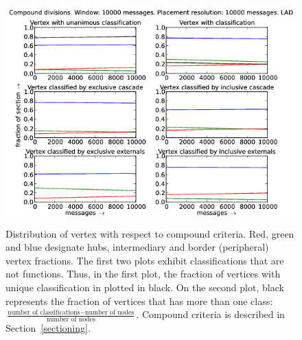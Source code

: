 \documentclass[%
 aip,
 jmp,%
 amsmath,amssymb,
 reprint,%
]{revtex4-1}
\begin{document}
\begin{figure}[hbtp] 
   \centering
        \includegraphics[width=\textwidth]{figs/LAD/10000_2}
    \caption{Distribution of vertex with respect to compound criteria. Red, green and blue designate hubs, intermediary and border (peripheral) vertex fractions. The first two plots exhibit classifications that are not functions. Thus, in the first plot, the fraction of vertices with unique classification in plotted in black. On the second plot, black represents the fraction of vertices that has more than one class: $\frac{\text{number of classifications} - \text{number of nodes}}{\text{number of nodes}}$. Compound criteria is described in Section~\ref{sectioning}.}
    \label{fig:lad10000_}
\end{figure}
\end{document}
